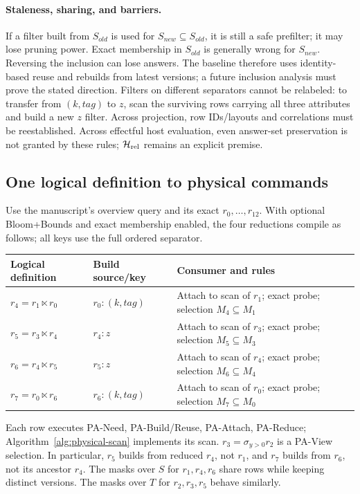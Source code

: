 \paragraph{Staleness, sharing, and barriers.}
If a filter built from $S_{old}$ is used for $S_{new}\subseteq S_{old}$, it
is still a safe prefilter; it may lose pruning power. Exact membership in
$S_{old}$ is generally wrong for $S_{new}$. Reversing the inclusion can lose
answers. The baseline therefore uses identity-based reuse and rebuilds from
latest versions; a future inclusion analysis must prove the stated direction.
Filters on different separators cannot be relabeled: to transfer from
$(k,tag)$ to $z$, scan the surviving rows carrying all three attributes and
build a new $z$ filter. Across projection, row IDs/layouts and correlations
must be reestablished. Across effectful host evaluation, even answer-set
preservation is not granted by these rules; $\mathcal H_{\rm rel}$ remains
an explicit premise.

\subsection{One logical definition to physical commands}
\label{sec:ya-trace}
Use the manuscript's overview query and its exact $r_0,\ldots,r_{12}$.
With optional Bloom+Bounds and exact membership enabled, the four reductions
compile as follows; all keys use the full ordered separator.
\begin{center}\small
\begin{tabular}{p{.15\linewidth}p{.27\linewidth}p{.47\linewidth}}
\toprule
Logical definition & Build source/key & Consumer and rules\\
\midrule
$r_4=r_1\ltimes r_0$ & $r_0:(k,tag)$ & Attach to scan of $r_1$; exact probe; selection $M_4\subseteq M_1$\\
$r_5=r_3\ltimes r_4$ & $r_4:z$ & Attach to scan of $r_3$; exact probe; selection $M_5\subseteq M_3$\\
$r_6=r_4\ltimes r_5$ & $r_5:z$ & Attach to scan of $r_4$; exact probe; selection $M_6\subseteq M_4$\\
$r_7=r_0\ltimes r_6$ & $r_6:(k,tag)$ & Attach to scan of $r_0$; exact probe; selection $M_7\subseteq M_0$\\
\bottomrule
\end{tabular}
\end{center}
Each row executes PA-Need, PA-Build/Reuse, PA-Attach, PA-Reduce;
Algorithm~\ref{alg:physical-scan} implements its scan. $r_3=\sigma_{y>0}r_2$
is a PA-View selection. In particular, $r_5$ builds from reduced $r_4$, not
$r_1$, and $r_7$ builds from $r_6$, not its ancestor $r_4$.
The masks over $S$ for $r_1,r_4,r_6$ share rows while keeping distinct versions.
The masks over $T$ for $r_2,r_3,r_5$ behave similarly.

